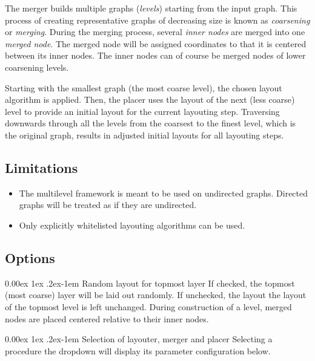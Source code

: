 \documentclass{tufte-handout}
\makeatletter
\renewcommand{\paragraph}{%
  \@startsection{paragraph}{4}%
  {\z@}{0.00ex \@plus 1ex \@minus .2ex}{-1em}%
  {\normalfont\normalsize\bfseries}%
}
\makeatother
\begin{document}
  The merger builds multiple graphs (\textit{levels}) starting from the input
  graph. This process of creating representative graphs of decreasing size is
  known as \textit{coarsening} or \textit{merging}. During the merging process,
  several \textit{inner nodes} are merged into one \textit{merged node}. The
  merged node will be assigned coordinates to that it is centered between its
  inner nodes. The inner nodes can of course be merged nodes of lower coarsening
  levels.

  Starting with the smallest graph (the most coarse level), the chosen layout
  algorithm is applied. Then, the placer uses the layout of the next (less
  coarse) level to provide an initial layout for the current layouting step.
  Traversing downwards through all the levels from the coarsest to the finest
  level, which is the original graph, results in adjusted initial layouts for
  all layouting steps.

  \subsection{Limitations}
  \begin{itemize}
  \item The multilevel framework is meant to be used on undirected graphs.
    Directed graphs will be treated as if they are undirected.
  \item Only explicitly whitelisted layouting algorithms can be used.
  \end{itemize}

  \subsection{Options}

  \paragraph{Random layout for topmost layer} If checked, the topmost (most
  coarse) layer will be laid out randomly. If unchecked, the layout the layout
  of the topmost level is left unchanged. During construction of a level, merged
  nodes are placed centered relative to their inner nodes.

  \paragraph{Selection of layouter, merger and placer} Selecting a procedure the
  dropdown will display its parameter configuration below.
\end{document}
